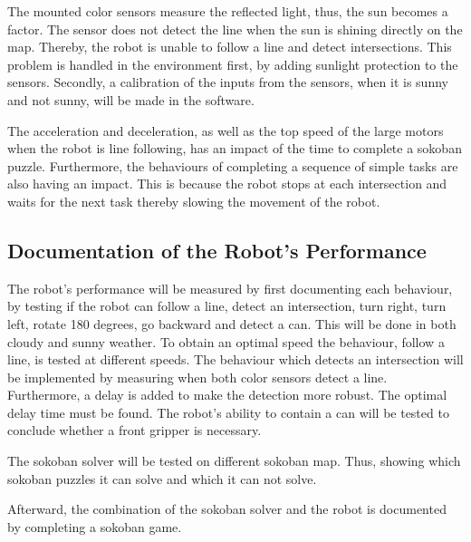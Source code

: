 \documentclass[../report.tex]{subfiles}
\begin{document}
The mounted color sensors measure the reflected light, thus, the sun becomes a factor. The sensor does not detect the line when the sun is shining directly on the map. Thereby, the robot is unable to follow a line and detect intersections. This problem is handled in the environment first, by adding sunlight protection to the sensors. Secondly, a calibration of the inputs from the sensors, when it is sunny and not sunny, will be made in the software.

The acceleration and deceleration, as well as the top speed of the large motors when the robot is line following, has an impact of the time to complete a sokoban puzzle. Furthermore, the behaviours of completing a sequence of simple tasks are also having an impact. This is because the robot stops at each intersection and waits for the next task thereby slowing the movement of the robot. 

\subsection*{Documentation of the Robot's Performance}

The robot's performance will be measured by first documenting each behaviour, by testing if the robot can follow a line, detect an intersection, turn right, turn left, rotate 180 degrees, go backward and detect a can. This will be done in both cloudy and sunny weather. To obtain an optimal speed the behaviour, follow a line, is tested at different speeds. The behaviour which detects an intersection will be implemented by measuring when both color sensors detect a line. Furthermore, a delay is added to make the detection more robust. The optimal delay time must be found. The robot's ability to contain a can will be tested to conclude whether a front gripper is necessary.

The sokoban solver will be tested on different sokoban map. Thus, showing which sokoban puzzles it can solve and which it can not solve.

Afterward, the combination of the sokoban solver and the robot is documented by completing a sokoban game.
\end{document}
